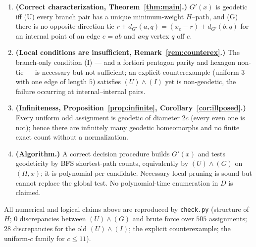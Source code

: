 \documentclass{amsart}
\theoremstyle{definition}
\begin{document}
\begin{enumerate}
\item \textbf{(Correct characterization, Theorem~\ref{thm:main}.)} $G'(x)$ is
geodetic iff (U) every branch pair has a unique minimum-weight $H$--path, and
(G) there is no opposite-direction tie
$r+d_{G'}(a,q)=(x_e-r)+d_{G'}(b,q)$ for an internal point of an edge $e=ab$ and
\emph{any} vertex $q$ off $e$.
\item \textbf{(Local conditions are insufficient,
Remark~\ref{rem:counterex}.)} The branch-only condition (I) --- and a fortiori
pentagon parity and hexagon non-tie --- is necessary but not sufficient; an
explicit counterexample (uniform $3$ with one edge of length $5$) satisfies
$(U)\wedge(I)$ yet is non-geodetic, the failure occurring at internal--internal
pairs.
\item \textbf{(Infiniteness, Proposition~\ref{prop:infinite},
Corollary~\ref{cor:illposed}.)} Every uniform odd assignment is geodetic of
diameter $2c$ (every even one is not); hence there are infinitely many geodetic
homeomorphs and no finite exact count without a normalization.
\item \textbf{(Algorithm.)} A correct decision procedure builds $G'(x)$ and
tests geodeticity by BFS shortest-path counts, equivalently by $(U)\wedge(G)$ on
$(H,x)$; it is polynomial per candidate. Necessary local pruning is sound but
cannot replace the global test. No polynomial-time enumeration in $D$ is claimed.
\end{enumerate}

All numerical and logical claims above are reproduced by \texttt{check.py}
(structure of $H$; $0$ discrepancies between $(U)\wedge(G)$ and brute force over
$505$ assignments; $28$ discrepancies for the old $(U)\wedge(I)$; the explicit
counterexample; the uniform-$c$ family for $c\le11$).
\end{document}
